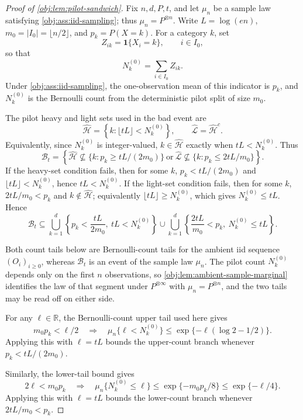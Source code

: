 \documentclass[11pt]{article}
\begin{document}
\begin{proof}[Proof of \cref{obj:lem:pilot-sandwich}]
Fix \(n,d,P,t\), and let \(\mu_n\) be a sample law satisfying \cref{obj:ass:iid-sampling}; thus \(\mu_n=P^{\otimes n}\). Write \(L=\log(en)\), \(m_0=|I_0|=\lfloor n/2\rfloor\), and \(p_k=P(X=k)\). For a category \(k\), set
\[
Z_{ik}=\mathbf 1\{X_i=k\},\qquad i\in I_0,
\]
so that
\[
N_k^{(0)}=\sum_{i\in I_0} Z_{ik}.
\]
Under \cref{obj:ass:iid-sampling}, the one-observation mean of this indicator is \(p_k\), and \(N_k^{(0)}\) is the Bernoulli count from the deterministic pilot split of size \(m_0\).

The pilot heavy and light sets used in the bad event are
\[
\widehat{\mathcal H}
=
\left\{k:\lfloor tL\rfloor<N_k^{(0)}\right\},
\qquad
\widehat{\mathcal L}=\widehat{\mathcal H}^{c}.
\]
Equivalently, since \(N_k^{(0)}\) is integer-valued, \(k\in\widehat{\mathcal H}\) exactly when \(tL<N_k^{(0)}\). Thus
\[
\mathcal B_t
=
\left\{
\widehat{\mathcal H}\not\subseteq\{k:p_k\ge tL/(2m_0)\}
\ \text{or}\ 
\widehat{\mathcal L}\not\subseteq\{k:p_k\le 2tL/m_0\}
\right\}.
\]
If the heavy-set condition fails, then for some \(k\),
\(p_k<tL/(2m_0)\) and \(\lfloor tL\rfloor<N_k^{(0)}\), hence \(tL<N_k^{(0)}\). If the light-set condition fails, then for some \(k\),
\(2tL/m_0<p_k\) and \(k\notin\widehat{\mathcal H}\); equivalently
\(\lfloor tL\rfloor\ge N_k^{(0)}\), which gives \(N_k^{(0)}\le tL\). Hence
\[
\mathcal B_t
\subseteq
\bigcup_{k=1}^d
\left\{p_k<\frac{tL}{2m_0},\ tL<N_k^{(0)}\right\}
\cup
\bigcup_{k=1}^d
\left\{\frac{2tL}{m_0}<p_k,\ N_k^{(0)}\le tL\right\}.
\]

Both count tails below are Bernoulli-count tails for the ambient iid sequence \((O_i)_{i\ge0}\), whereas \(\mathcal B_t\) is an event of the sample law \(\mu_n\). The pilot count \(N_k^{(0)}\) depends only on the first \(n\) observations, so \cref{obj:lem:ambient-sample-marginal} identifies the law of that segment under \(P^{\otimes\infty}\) with \(\mu_n=P^{\otimes n}\), and the two tails may be read off on either side.

For any \(\ell\in\mathbb R\), the Bernoulli-count upper tail used here gives
\[
m_0p_k<\ell/2
\quad\Longrightarrow\quad
\mu_n\{\ell<N_k^{(0)}\}
\le
\exp\{-\ell(\log 2-1/2)\}.
\]
Applying this with \(\ell=tL\) bounds the upper-count branch whenever
\(p_k<tL/(2m_0)\).

Similarly, the lower-tail bound gives
\[
2\ell<m_0p_k
\quad\Longrightarrow\quad
\mu_n\{N_k^{(0)}\le \ell\}
\le
\exp\{-m_0p_k/8\}
\le
\exp\{-\ell/4\}.
\]
Applying this with \(\ell=tL\) bounds the lower-count branch whenever
\(2tL/m_0<p_k\).


\end{proof}
\end{document}
